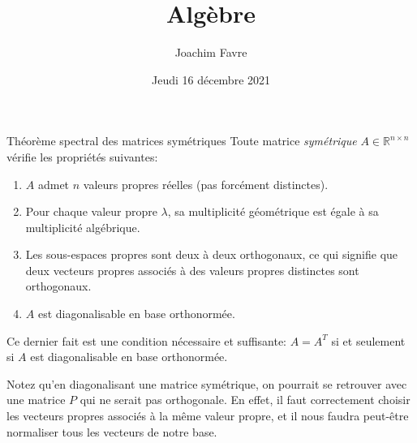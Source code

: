 \documentclass[a4paper]{article}
\title{Algèbre}
\author{Joachim Favre}
\date{Jeudi 16 décembre 2021}
\begin{document}
\maketitle


\begin{parag}{Théorème spectral des matrices symétriques}
    Toute matrice \textit{symétrique} $A \in \mathbb{R}^{n \times n}$ vérifie les propriétés suivantes:
    \begin{enumerate}
        \item $A$ admet $n$ valeurs propres réelles (pas forcément distinctes).
        \item Pour chaque valeur propre $\lambda$, sa multiplicité géométrique est égale à sa multiplicité algébrique.
        \item Les sous-espaces propres sont deux à deux orthogonaux, ce qui signifie que deux vecteurs propres associés à des valeurs propres distinctes sont orthogonaux.
        \item $A$ est diagonalisable en base orthonormée.
    \end{enumerate}

    Ce dernier fait est une condition nécessaire et suffisante: $A = A^T$ si et seulement si $A$ est diagonalisable en base orthonormée.

    Notez qu'en diagonalisant une matrice symétrique, on pourrait se retrouver avec une matrice $P$ qui ne serait pas orthogonale. En effet, il faut correctement choisir les vecteurs propres associés à la même valeur propre, et il nous faudra peut-être normaliser tous les vecteurs de notre base.


\end{parag}
\end{document}
